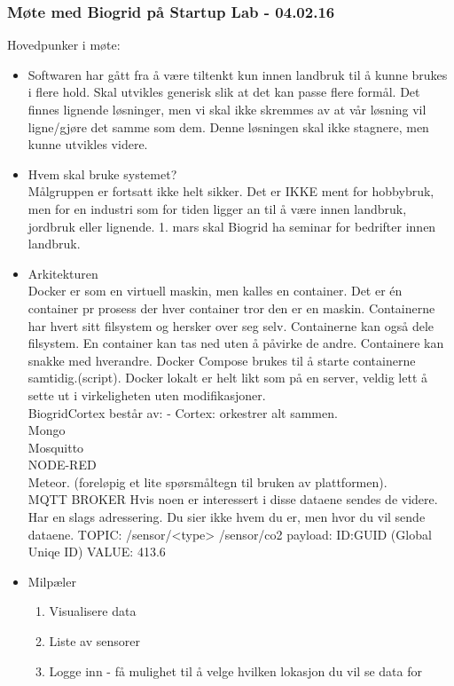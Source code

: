 \documentclass[12pt, oneside]{article}
\begin{document}
\subsubsection{Møte med Biogrid på Startup Lab - 04.02.16 }
Hovedpunker i møte:
\begin{itemize}
	\item Softwaren har gått fra å være tiltenkt kun innen landbruk til å kunne brukes i flere hold. Skal utvikles generisk slik at det kan passe flere 			formål. Det finnes lignende løsninger, men vi skal ikke skremmes av at vår løsning vil ligne/gjøre det samme som dem. Denne løsningen 			skal ikke stagnere, men kunne utvikles videre.
	\item Hvem skal bruke systemet?\\
	 	Målgruppen er fortsatt ikke helt sikker. Det er IKKE ment for hobbybruk, men for en industri som for tiden ligger an til å være 					innen landbruk, jordbruk eller lignende. 1. mars skal Biogrid ha seminar for bedrifter innen landbruk.
	\item Arkitekturen\\
		Docker er som en virtuell maskin, men kalles en container. Det er én container pr prosess der hver container tror den er en maskin. 				Containerne har hvert sitt filsystem og hersker over seg selv. Containerne kan også dele filsystem. En container kan tas ned uten å påvirke 		de andre. Containere kan snakke med hverandre. Docker Compose brukes til å starte containerne samtidig.(script). Docker lokalt er helt likt 		som på en server, veldig lett å sette ut i virkeligheten uten modifikasjoner.\\
	
		 BiogridCortex består av: - Cortex: orkestrer alt sammen. \\
		 Mongo\\
		 Mosquitto\\
		 NODE-RED\\
		 Meteor. (foreløpig et lite spørsmåltegn til bruken av plattformen).\\
		 MQTT BROKER Hvis noen er interessert i disse dataene sendes de videre. Har en slags adressering. Du sier ikke hvem du er, men hvor 		du vil sende dataene. TOPIC: /sensor/<type> /sensor/co2 payload: ID:GUID (Global Uniqe ID) VALUE: 413.6
		 
	\item Milpæler
		\begin{enumerate}
			\item Visualisere data
			\item Liste av sensorer
			\item Logge inn - få mulighet til å velge hvilken lokasjon du vil se data for
		\end{enumerate}
		

\end{itemize}
\end{document}
